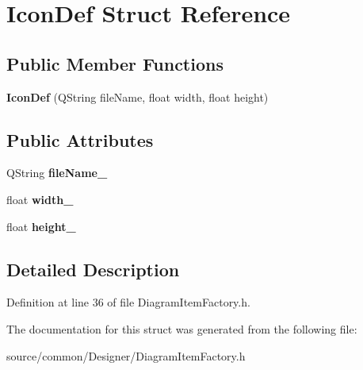 \hypertarget{struct_icon_def}{\section{Icon\-Def Struct Reference}
\label{struct_icon_def}
}
\subsection*{Public Member Functions}
\begin{DoxyCompactItemize}
\item 
\hypertarget{struct_icon_def_abd14278f8b438fcac54592bf43dc240c}{{\bfseries Icon\-Def} (Q\-String file\-Name, float width, float height)}\label{struct_icon_def_abd14278f8b438fcac54592bf43dc240c}

\end{DoxyCompactItemize}
\subsection*{Public Attributes}
\begin{DoxyCompactItemize}
\item 
\hypertarget{struct_icon_def_a745407c6962f99c975806bf9dd155b83}{Q\-String {\bfseries file\-Name\-\_\-}}\label{struct_icon_def_a745407c6962f99c975806bf9dd155b83}

\item 
\hypertarget{struct_icon_def_a660749117f6e33e6becb2b5e0919a4b5}{float {\bfseries width\-\_\-}}\label{struct_icon_def_a660749117f6e33e6becb2b5e0919a4b5}

\item 
\hypertarget{struct_icon_def_a067ea4570c0cc67f58c9a631c8649b19}{float {\bfseries height\-\_\-}}\label{struct_icon_def_a067ea4570c0cc67f58c9a631c8649b19}

\end{DoxyCompactItemize}


\subsection{Detailed Description}


Definition at line 36 of file Diagram\-Item\-Factory.\-h.



The documentation for this struct was generated from the following file\-:\begin{DoxyCompactItemize}
\item 
source/common/\-Designer/Diagram\-Item\-Factory.\-h\end{DoxyCompactItemize}
